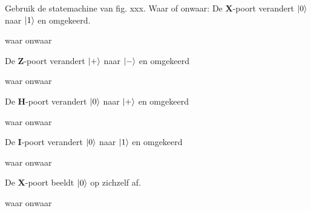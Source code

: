 \documentclass[a4paper, addpoints, 12pt
    , noanswers    %
    ]{exam}
\newcommand*{\port}[1]{\textbf{#1}}
\begin{document}
\begin{questions}
Gebruik de statemachine van fig. xxx. Waar of onwaar:
\question[1]
De \port{X}-poort verandert $\ket{0}$ naar $\ket{1}$ en omgekeerd.

\begin{oneparchoices}
\correctchoice waar
\choice onwaar
\end{oneparchoices}

\question[1]
De \port{Z}-poort verandert $\ket{+}$ naar $\ket{-}$ en omgekeerd

\begin{oneparchoices}
\correctchoice waar 
\choice onwaar
\end{oneparchoices} 
\question[1]
De \port{H}-poort verandert $\ket{0}$ naar $\ket{+}$ en omgekeerd

\begin{oneparchoices}
\correctchoice waar
\choice onwaar
\end{oneparchoices}

\question[1]
De \port{I}-poort verandert $\ket{0}$ naar $\ket{1}$ en omgekeerd

\begin{oneparchoices}
\choice waar
\correctchoice onwaar
\end{oneparchoices}

\question[1]
De \port{X}-poort beeldt $\ket{0}$ op zichzelf af.

\begin{oneparchoices}
\choice waar
\correctchoice onwaar
\end{oneparchoices}

\begin{parts}



\end{parts}
\end{questions}
\end{document}
